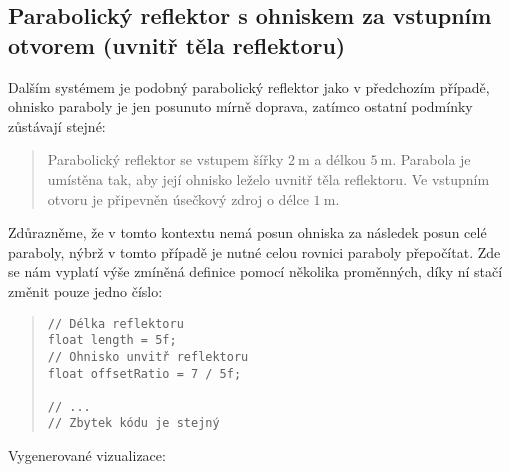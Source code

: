 


\subsection[Parabolický reflektor s ohniskem za vstupním otvorem]{Parabolický reflektor s ohniskem za vstupním otvorem (uvnitř těla reflektoru)}

Dalším systémem je podobný parabolický reflektor jako v předchozím případě, ohnisko paraboly je jen posunuto mírně doprava, zatímco ostatní podmínky zůstávají stejné:

\begin{quote}
    Parabolický reflektor se vstupem šířky $2\ \mathrm{m}$ a délkou $5\ \mathrm{m}$. Parabola je umístěna tak, aby její ohnisko leželo uvnitř těla reflektoru. Ve vstupním otvoru je připevněn úsečkový zdroj o délce $1\ \mathrm{m}$.
\end{quote}

Zdůrazněme, že v tomto kontextu nemá posun ohniska za následek posun celé paraboly, nýbrž v tomto případě je nutné celou rovnici paraboly přepočítat. Zde se nám vyplatí výše zmíněná definice pomocí několika proměnných, díky ní stačí změnit pouze jedno číslo:

\begin{minipage}{\textwidth}\begin{quote}\begin{lstlisting}
// Délka reflektoru
float length = 5f;
// Ohnisko unvitř reflektoru
float offsetRatio = 7 / 5f;

// ...
// Zbytek kódu je stejný
\end{lstlisting}\end{quote}\end{minipage}

Vygenerované vizualizace:




